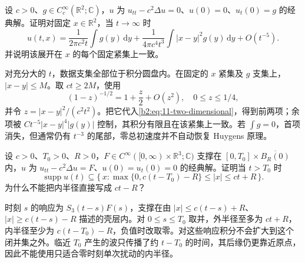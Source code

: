 \begin{exercise}\label{b2:ex:11-two-dimensional-tail}
设 \(c>0\)、\(g\in C_c^\infty(\mathbb R^2;\mathbb C)\)，\(u\) 为 \(u_{tt}-c^2\Delta u=0\)、\(u(0)=0\)、\(u_t(0)=g\) 的经典解。证明对固定 \(x\in\mathbb R^2\)，当 \(t\to\infty\) 时
\[
 u(t,x)=\dfrac1{2\pi c^2t}\int g(y)\,\mathrm{d}y
 +\dfrac1{4\pi c^4t^3}\int|x-y|^2g(y)\,\mathrm{d}y+O(t^{-5}).
\]
并说明该展开在 \(x\) 的每个固定紧集上一致。
\end{exercise}
\begin{solution}
对充分大的 \(t\)，数据支集全部位于积分圆盘内。在固定的 \(x\) 紧集及 \(g\) 支集上，\(|x-y|\leq M\)。取 \(ct\geq2M\)，使用
\[
 (1-z)^{-1/2}=1+\dfrac z2+O(z^2),\quad 0\leq z\leq1/4,
\]
并令 \(z=|x-y|^2/(c^2t^2)\)。把它代入\eqref{b2:eq:11-two-dimensional}，得到前两项；余项被 \(Ct^{-5}|x-y|^4|g(y)|\) 控制，其积分有限且在该紧集上一致。若 \(\int g=0\)，首项消失，但通常仍有 \(t^{-3}\) 的尾部，零总初速度并不自动恢复 Huygens 原理。
\end{solution}

\begin{exercise}\label{b2:ex:11-forcing-shell}
设 \(c>0\)、\(T_0>0\)、\(R>0\)，\(F\in C^\infty([0,\infty)\times\mathbb R^3;\mathbb C)\) 支撑在 \([0,T_0]\times\overline{B_R(0)}\) 内，\(u\) 为 \(u_{tt}-c^2\Delta u=F\)、\(u(0)=u_t(0)=0\) 的经典解。证明当 \(t>T_0\) 时
\[
 \operatorname{supp}u(t)\subseteq
 \{\,x:\max\{0,c(t-T_0)-R\}\leq|x|\leq ct+R\,\}.
\]
为什么不能把内半径直接写成 \(ct-R\)？
\end{exercise}
\begin{solution}
时刻 \(s\) 的响应为 \(S_3(t-s)F(s)\)，支撑在由 \(|x|\leq c(t-s)+R\)、\(|x|\geq c(t-s)-R\) 描述的壳层内。对 \(0\leq s\leq T_0\) 取并，外半径至多为 \(ct+R\)，内半径至少为 \(c(t-T_0)-R\)，负值时改取零。对这些响应积分不会扩大到这个闭并集之外。临近 \(T_0\) 产生的波只传播了约 \(t-T_0\) 的时间，其后缘仍更靠近原点，因此不能使用只适合零时刻单次扰动的内半径。
\end{solution}

